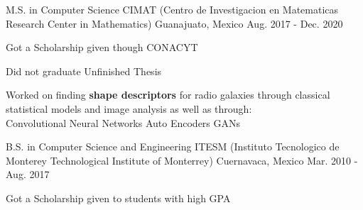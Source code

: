 

\begin{cventries}


\cventry
    {M.S. in Computer Science} %
    {CIMAT (Centro de Investigacion en Matematicas {\enskip\cdotp\enskip} Research Center in Mathematics)} %
    {Guanajuato, Mexico} %
    {Aug. 2017 - Dec. 2020} %
    {
    \begin{cvitems} %
        \item {Got a Scholarship given though CONACYT}
        \item {Did not graduate {\enskip\cdotp\enskip} Unfinished Thesis}
        \item {Worked on finding \textbf{shape descriptors} for radio galaxies through classical statistical models and image analysis as well as through:\\ 
        {\enskip\cdotp\enskip} Convolutional Neural Networks {\enskip\cdotp\enskip} Auto Encoders {\enskip\cdotp\enskip} GANs}
    \end{cvitems}
    }
  \cventry
    {B.S. in Computer Science and Engineering} %
    {ITESM ({Instituto Tecnologico de Monterey\enskip\cdotp\enskip} Technological Institute of Monterrey)} %
    {Cuernavaca, Mexico} %
    {Mar. 2010 - Aug. 2017} %
    {
      \begin{cvitems} %
        \item {Got a Scholarship given to students with high GPA}
      \end{cvitems}
    }

\end{cventries}
